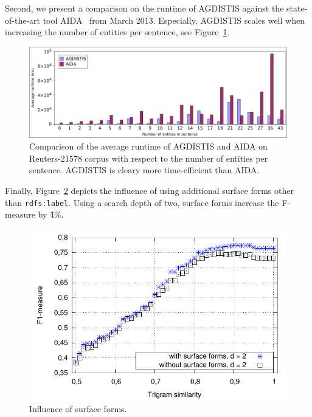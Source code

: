 Second, we present a comparison on the runtime of AGDISTIS against the state-of-the-art tool AIDA~\cite{AIDA} from March 2013. Especially, AGDISTIS scales well when increasing the number of entities per sentence, see Figure~\ref{fig:runtimeVSentities}.
\begin{figure}[htb!]    
    \centering  
         \includegraphics[width=\linewidth]{Appendix/fig/runtimes.pdf}
    \caption{Comparison of the average runtime of AGDISTIS and AIDA on Reuters-21578 corpus with respect to the number of entities per sentence. AGDISTIS is cleary more time-efficient than AIDA.}\label{fig:runtimeVSentities} 
\end{figure}

Finally, Figure~\ref{fig:agdistis:surfaceforms} depicts the influence of using additional surface forms other than \texttt{rdfs:label}. Using a search depth of two, surface forms increase the F-measure by \~4\%.
\begin{figure}[htb!]    
    \centering  
         \includegraphics[width=0.8\linewidth]{Appendix/fig/surface.pdf}
    \caption{Influence of surface forms.} 
    \label{fig:agdistis:surfaceforms}
\end{figure}

